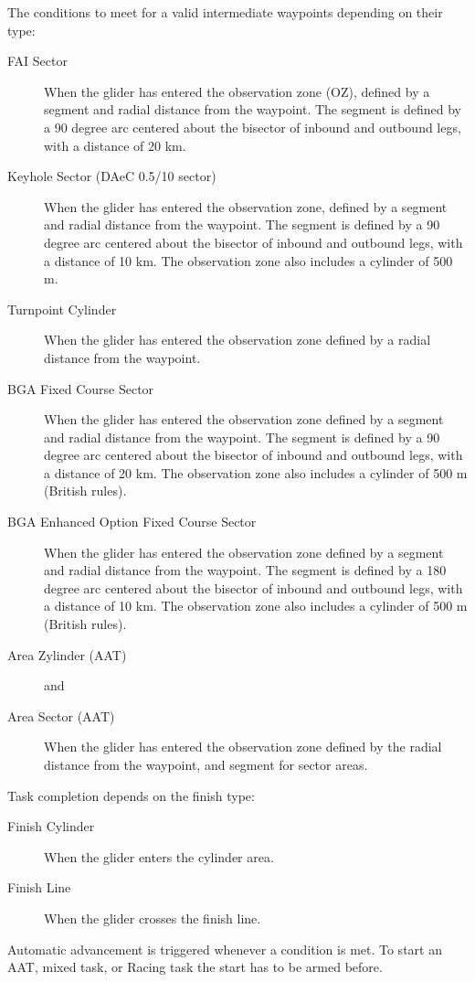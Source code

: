 The conditions to meet for a valid intermediate waypoints depending on their
 type:
\begin{description}
\item[FAI Sector] When the glider has entered the observation zone (OZ), defined 
by a segment and radial distance from the waypoint.  The segment is
defined by a 90 degree arc centered about the bisector of inbound and
outbound legs, with a distance of 20 km.
\item[Keyhole Sector (DAeC 0.5/10 sector)] When the glider has entered the
observation zone, defined by a segment and radial distance from the waypoint.  The segment is
defined by a 90 degree arc centered about the bisector of inbound and
outbound legs, with a distance of 10 km.  The observation zone also includes
a cylinder of 500 m.
\item[Turnpoint Cylinder]  When the glider has entered the observation zone
defined by a radial distance from the waypoint.
\item[BGA Fixed Course Sector]  When the glider has entered the
observation zone defined by a segment and radial distance from the
waypoint. The segment is defined by a 90 degree arc centered about the
bisector of inbound and outbound legs, with a distance of 20 km.
The observation zone also includes a cylinder of 500 m (British rules).
\item[BGA Enhanced Option Fixed Course Sector]  When the glider has entered the
observation zone defined by a segment and radial distance from the
waypoint. The segment is defined by a 180 degree arc centered about the
bisector of inbound and outbound legs, with a distance of 10 km.
The observation zone also includes a cylinder of 500 m (British rules).
\item[Area Zylinder (AAT)]  and
\item[Area Sector (AAT)]  When the glider has entered the observation zone
defined by the radial distance from the waypoint, and segment for sector areas.
\end{description}

Task completion depends on the finish type:
\begin{description}
\item[Finish Cylinder] When the glider enters the cylinder area.
\item[Finish Line] When the glider crosses the finish line.
\end{description}

Automatic advancement is triggered whenever a condition is met. To start an AAT,
mixed task, or Racing task the start has to be armed before. 


